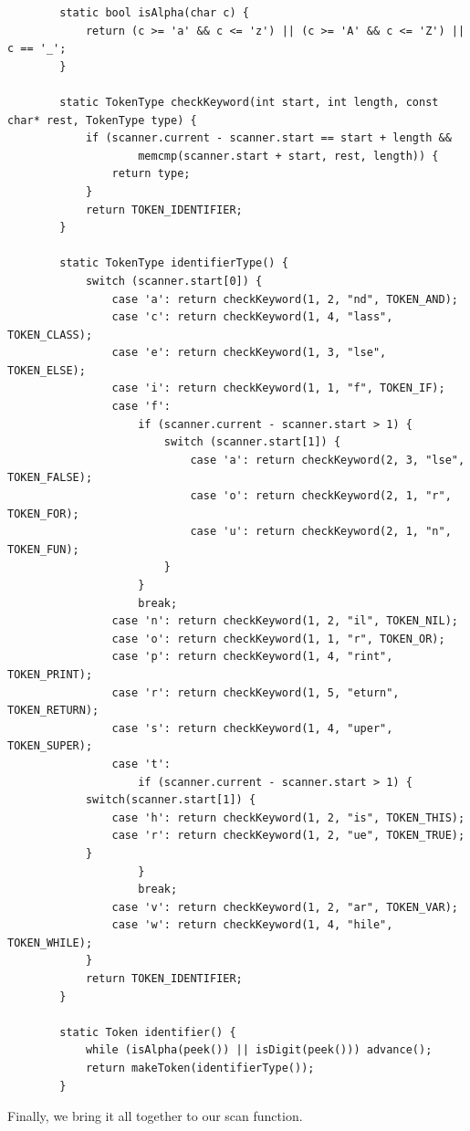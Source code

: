 	\begin{lstlisting}
		static bool isAlpha(char c) {
			return (c >= 'a' && c <= 'z') || (c >= 'A' && c <= 'Z') || c == '_';
		}

		static TokenType checkKeyword(int start, int length, const char* rest, TokenType type) {
			if (scanner.current - scanner.start == start + length && 
					memcmp(scanner.start + start, rest, length)) {
				return type;
			}
			return TOKEN_IDENTIFIER;
		}

		static TokenType identifierType() { 
			switch (scanner.start[0]) {
				case 'a': return checkKeyword(1, 2, "nd", TOKEN_AND);
				case 'c': return checkKeyword(1, 4, "lass", TOKEN_CLASS);
				case 'e': return checkKeyword(1, 3, "lse", TOKEN_ELSE);
				case 'i': return checkKeyword(1, 1, "f", TOKEN_IF);
				case 'f': 
					if (scanner.current - scanner.start > 1) {
						switch (scanner.start[1]) {
							case 'a': return checkKeyword(2, 3, "lse", TOKEN_FALSE);
							case 'o': return checkKeyword(2, 1, "r", TOKEN_FOR);
							case 'u': return checkKeyword(2, 1, "n", TOKEN_FUN);
						}
					}
					break;
				case 'n': return checkKeyword(1, 2, "il", TOKEN_NIL);
				case 'o': return checkKeyword(1, 1, "r", TOKEN_OR);
				case 'p': return checkKeyword(1, 4, "rint", TOKEN_PRINT);
				case 'r': return checkKeyword(1, 5, "eturn", TOKEN_RETURN);
				case 's': return checkKeyword(1, 4, "uper", TOKEN_SUPER);
				case 't':
					if (scanner.current - scanner.start > 1) {
			switch(scanner.start[1]) {
				case 'h': return checkKeyword(1, 2, "is", TOKEN_THIS); 
				case 'r': return checkKeyword(1, 2, "ue", TOKEN_TRUE);
			}
					}
					break;
				case 'v': return checkKeyword(1, 2, "ar", TOKEN_VAR);
				case 'w': return checkKeyword(1, 4, "hile", TOKEN_WHILE); 
			}
			return TOKEN_IDENTIFIER;
		}

		static Token identifier() {
			while (isAlpha(peek()) || isDigit(peek())) advance(); 
			return makeToken(identifierType());
		}
	\end{lstlisting}

	Finally, we bring it all together to our scan function. 

